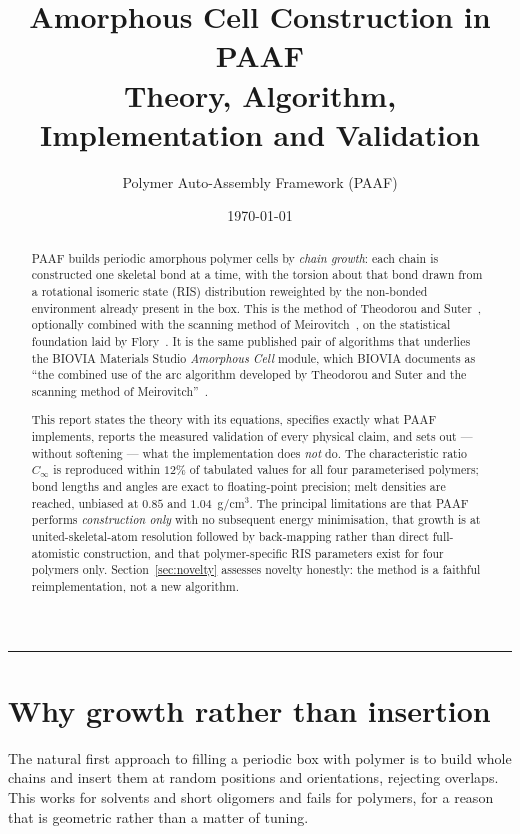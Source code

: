 \documentclass[11pt,a4paper]{article}
\title{\vspace{-1.2cm}\textbf{Amorphous Cell Construction in PAAF}\\[4pt]
\large Theory, Algorithm, Implementation and Validation}
\author{Polymer Auto-Assembly Framework (PAAF)}
\date{\today}
\begin{document}
\maketitle
\thispagestyle{fancy}

\begin{abstract}
\noindent
PAAF builds periodic amorphous polymer cells by \emph{chain growth}: each
chain is constructed one skeletal bond at a time, with the torsion about that
bond drawn from a rotational isomeric state (RIS) distribution reweighted by
the non-bonded environment already present in the box. This is the method of
Theodorou and Suter~\cite{ts1985}, optionally combined with the scanning
method of Meirovitch~\cite{meirovitch1983}, on the statistical foundation laid
by Flory~\cite{flory1969}. It is the same published pair of algorithms that
underlies the BIOVIA Materials Studio \emph{Amorphous Cell} module, which
BIOVIA documents as ``the combined use of the arc algorithm developed by
Theodorou and Suter and the scanning method of Meirovitch''~\cite{biovia}.

This report states the theory with its equations, specifies exactly what PAAF
implements, reports the measured validation of every physical claim, and sets
out --- without softening --- what the implementation does \emph{not} do. The
characteristic ratio $C_\infty$ is reproduced within $12\%$ of tabulated
values for all four parameterised polymers; bond lengths and angles are exact
to floating-point precision; melt densities are reached, unbiased at
$0.85$ and $1.04$~g/cm$^3$. The principal limitations are that PAAF performs \emph{construction
only} with no subsequent energy minimisation, that growth is at
united-skeletal-atom resolution followed by back-mapping rather than direct
full-atomistic construction, and that polymer-specific RIS parameters exist
for four polymers only. Section~\ref{sec:novelty} assesses novelty honestly:
the method is a faithful reimplementation, not a new algorithm.
\end{abstract}

\tableofcontents
\vspace{6pt}
\hrule

\section{Why growth rather than insertion}
\label{sec:why}

The natural first approach to filling a periodic box with polymer is to build
whole chains and insert them at random positions and orientations, rejecting
overlaps. This works for solvents and short oligomers and fails for polymers,
for a reason that is geometric rather than a matter of tuning.
\end{document}
